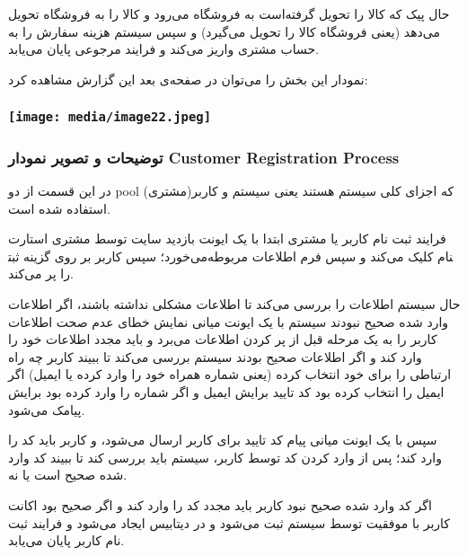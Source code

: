 \documentclass[]{article}
\begin{document}
حال پیک که کالا را تحویل گرفته‌است به فروشگاه می‌رود و کالا را به
فروشگاه تحویل می‌دهد (یعنی فروشگاه کالا را تحویل می‌گیرد) و سپس سیستم
هزینه سفارش را به حساب مشتری واریز می‌کند و فرایند مرجوعی پایان می‌یابد.

نمودار این بخش را می‌توان در صفحه‌ی بعد این گزارش مشاهده کرد:

\subsubsection{}\label{section}

\subsubsection{\texorpdfstring{\protect\texttt{[image: media/image22.jpeg]}}{}}\label{section-1}

\subsubsection{توضیحات و تصویر نمودار Customer Registration
Process}\label{ux62aux648ux636ux6ccux62dux627ux62a-ux648-ux62aux635ux648ux6ccux631-ux646ux645ux648ux62fux627ux631-customer-registration-process}

در این قسمت از دو pool که اجزای کلی سیستم هستند یعنی سیستم و
کاربر(مشتری) استفاده شده است.

فرایند ثبت نام کاربر یا مشتری ابتدا با یک ایونت بازدید سایت توسط مشتری
استارت می‌خورد؛ سپس کاربر بر روی گزینه ثبت‎نام کلیک می‌کند و سپس فرم
اطلاعات مربوطه را پر می‌کند.

حال سیستم اطلاعات را بررسی می‌کند تا اطلاعات مشکلی نداشته باشند، اگر
اطلاعات وارد شده صحیح نبودند سیستم با یک ایونت میانی نمایش خطای عدم صحت
اطلاعات کاربر را به یک مرحله قبل از پر کردن اطلاعات می‌برد و باید مجدد
اطلاعات خود را وارد کند و اگر اطلاعات صحیح بودند سیستم بررسی می‌کند تا
ببیند کاربر چه راه ارتباطی را برای خود انتخاب کرده (یعنی شماره همراه خود
را وارد کرده یا ایمیل) اگر ایمیل را انتخاب کرده بود کد تایید برایش ایمیل
و اگر شماره را وارد کرده بود برایش پیامک می‌شود.

سپس با یک ایونت میانی پیام کد تایید برای کاربر ارسال می‌شود، و کاربر
باید کد را وارد کند؛ پس از وارد کردن کد توسط کاربر، سیستم باید بررسی کند
تا ببیند کد وارد شده صحیح است یا نه.

اگر کد وارد شده صحیح نبود کاربر باید مجدد کد را وارد کند و اگر صحیح بود
اکانت کاربر با موفقیت توسط سیستم ثبت می‌شود و در دیتابیس ایجاد می‌شود و
فرایند ثبت نام کاربر پایان می‌یابد.
\end{document}

